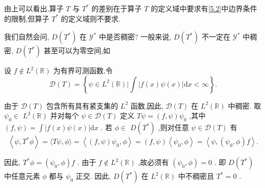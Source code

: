 \documentclass[lang=cn,newtx,10pt,scheme=chinese,thmcnt=chapter]{elegantbook}
\newcommand{\dif}{\mathrm{d}}
\begin{document}
由上可以看出,算子 \(T\) 与 \({T}^{ * }\) 的差别在于算子 \(T\) 的定义域中要求有\ref{5.2}中边界条件的限制,但算子 \({T}^{ * }\) 的定义域则不要求.

我们自然会问, \(D\left( {T}^{ * }\right)\) 在 \({\mathcal{Y}}^{ * }\) 中是否稠密? 一般来说, \(D\left( {T}^{ * }\right)\) 不一定在 \({\mathcal{Y}}^{ * }\) 中稠密, \(D\left( {T}^{ * }\right)\) 甚至可以为零空间,如
\begin{example}
    设 \(f \notin  {L}^{2}\left( \mathbb{R}\right)\) 为有界可测函数,令
\begin{equation*}
\mathcal{D}(T)  = \left\{  {\psi  \in  {L}^{2}\left( \mathbb{R}\right) | \int \left| f\left( x\right) \psi \left( x\right)  \right|  {\dif x} < \infty }\right\}  .
\end{equation*}

由于 \(\mathcal{D}(T)\) 包含所有具有紧支集的 \({L}^{2}\) 函数,因此, \(\mathcal{D}(T)\) 在 \({L}^{2}\left( \mathbb{R}\right)\) 中稠密. 取 \({\psi }_{0} \in\)  \({L}^{2}\left( \mathbb{R}\right)\) 并对每个 \(\psi  \in  \mathcal{D}(T)\) 定义 \({T\psi } = \left( {f,\psi }\right) {\psi }_{0}\) ,其中 \(\left( {f,\psi }\right)  = \int \left| {f\left( x\right) \psi \left( x\right) }\right| {\dif x}\) . 若 \(\phi  \in\)  \(D\left( {T}^{ * }\right)\) ,则对任意 \(\psi  \in  \mathcal{D}(T)\) 有
\begin{equation*}
\left\langle  {\psi ,{T}^{ * }\phi }\right\rangle   = \langle {T\psi },\phi \rangle  = \left\langle  {\left( {f,\psi }\right) {\psi }_{0},\phi }\right\rangle
= \left( {f,\psi }\right) \left\langle  {{\psi }_{0},\phi }\right\rangle   = \left\langle  {\psi ,\left( {{\psi }_{0},\phi }\right) f}\right\rangle  .
\end{equation*}

因此, \({T}^{ * }\phi  = \left( {{\psi }_{0},\phi }\right) f\) . 由于 \(f \notin  {L}^{2}\left( \mathbb{R}\right)\) ,故必须有 \(\left( {{\psi }_{0},\phi }\right)  = 0\) . 即 \(D\left( {T}^{ * }\right)\) 中任意元素 \(\phi\) 都与 \({\psi }_{0}\) 正交. 因此, \(D\left( {T}^{ * }\right)\) 在 \({L}^{2}\left( \mathbb{R}\right)\) 中不稠密且 \({T}^{ * } = 0\) .

\end{example}
\end{document}
